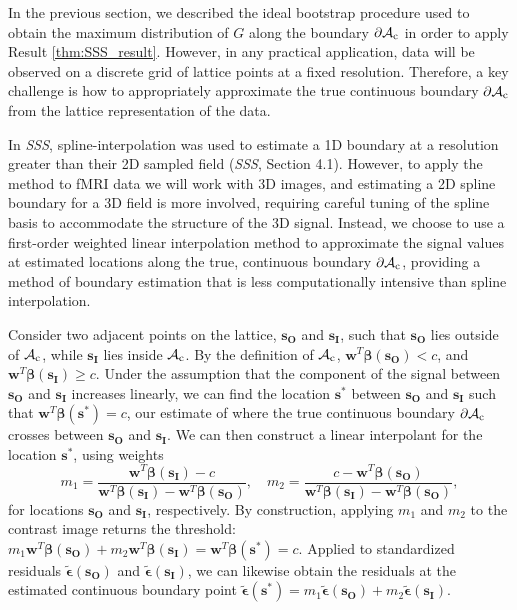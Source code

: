 In the previous section, we described the ideal bootstrap procedure used to obtain the maximum distribution of $G$ along the boundary $\operatorname{\partial\mathcal{A}_{c}}$ in order to apply Result \ref{thm:SSS_result}. However, in any practical application, data will be observed on a discrete grid of lattice points at a fixed resolution. Therefore, a key challenge is how to appropriately approximate the true continuous boundary $\operatorname{\partial\mathcal{A}_{c}}$ from the lattice representation of the data. 

In \textit{SSS}, spline-interpolation was used to estimate a 1D boundary at a resolution greater than their 2D sampled field (\textit{SSS}, Section 4.1). However, to apply the method to fMRI data we will work with 3D images, and estimating a 2D spline boundary for a 3D field is more involved, requiring careful tuning of the spline basis to accommodate the structure of the 3D signal. Instead, we choose to use a first-order weighted linear interpolation method to approximate the signal values at estimated locations along the true, continuous boundary $\operatorname{\partial\mathcal{A}_{c}}$, providing a method of boundary estimation that is less computationally intensive than spline interpolation.

Consider two adjacent points on the lattice, $\bm{s_O}$ and $\bm{s_I}$, such that $\bm{s_O}$ lies outside of $\operatorname{\mathcal{A}_{c}}$, while $\bm{s_I}$ lies inside $\operatorname{\mathcal{A}_{c}}$. By the definition of $\operatorname{\mathcal{A}_{c}}$, $\bm{w}^{T}\bm{\beta}(\bm{s_O}) < c$, and $\bm{w}^{T}\bm{\beta}(\bm{s_I}) \geq c$. Under the assumption that the component of the signal between $\bm{s_O}$ and $\bm{s_I}$ increases linearly, we can find the location $\bm{s}^{*}$ between $\bm{s_O}$ and $\bm{s_I}$ such that $\bm{w}^{T}\bm{\beta}(\bm{s}^{*}) = c$, our estimate of where the true continuous boundary $\operatorname{\partial\mathcal{A}_{c}}$ crosses between $\bm{s_O}$ and $\bm{s_I}$. We can then construct a linear interpolant for the location $\bm{s}^{*}$, using weights
\begin{equation}
\label{eq:interpolation_weights}
m_{1} = \frac{\bm{w}^{T}\bm{\beta}(\bm{s_I}) - c}{\bm{w}^{T}\bm{\beta}(\bm{s_I}) - \bm{w}^{T}\bm{\beta}(\bm{s_O})}, \quad m_{2} = \frac{c - \bm{w}^{T}\bm{\beta}(\bm{s_O})}{\bm{w}^{T}\bm{\beta}(\bm{s_I}) - \bm{w}^{T}\bm{\beta}(\bm{s_O})},
\end{equation}
for locations $\bm{s_O}$ and $\bm{s_I}$, respectively. By construction, applying $m_1$ and $m_2$ to the contrast image returns the threshold: $m_1 \bm{w}^{T}\bm{\beta}(\bm{s_O}) + m_2 \bm{w}^{T}\bm{\beta}(\bm{s_I}) = \bm{w}^{T}\bm{\beta}(\bm{s}^{*}) = c$. Applied to standardized residuals %
$\tilde{\bm{\epsilon}}(\bm{s_O})$ and $\tilde{\bm{\epsilon}}(\bm{s_I})$, we can likewise obtain the residuals at the estimated continuous boundary point $\tilde{\bm{\epsilon}}(\bm{s}^{*}) = m_1 \tilde{\bm{\epsilon}}(\bm{s_O}) + m_2\tilde{\bm{\epsilon}}(\bm{s_I})$.


